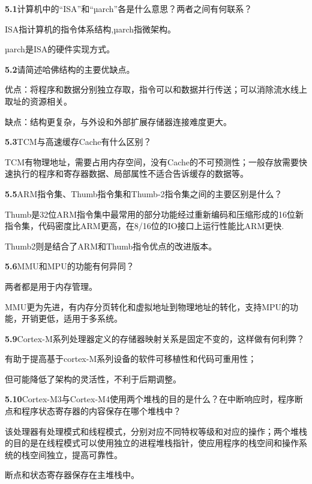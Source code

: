 \documentclass{article}
\begin{document}
    \noindent\textbf{5.1}计算机中的“ISA”和“µarch”各是什么意思？两者之间有何联系？\par
    ISA指计算机的指令体系结构,µarch指微架构。\par
    µarch是ISA的硬件实现方式。
    \\[4pt]\par

    \noindent\textbf{5.2}请简述哈佛结构的主要优缺点。\par
    优点：将程序和数据分别独立存取，指令可以和数据并行传送；可以消除流水线上取址的资源相关。\par
    缺点：结构更复杂，与外设和外部扩展存储器连接难度更大。
    \\[4pt]\par

    \noindent\textbf{5.3}TCM与高速缓存Cache有什么区别？\par
    TCM有物理地址，需要占用内存空间，没有Cache的不可预测性；一般存放需要快速执行的程序和寄存器数据、局部属性不适合告诉缓存的数据等。
    \\[4pt]\par

    \noindent\textbf{5.5}ARM指令集、Thumb指令集和Thumb-2指令集之间的主要区别是什么？\par
    Thumb是32位ARM指令集中最常用的部分功能经过重新编码和压缩形成的16位新指令集，代码密度比ARM更高，在8/16位的IO接口上运行性能比ARM更快.\par
    Thumb2则是结合了ARM和Thumb指令优点的改进版本。
    \\[4pt]\par

    \noindent\textbf{5.6}MMU和MPU的功能有何异同？\par
    两者都是用于内存管理。\par
    MMU更为先进，有内存分页转化和虚拟地址到物理地址的转化，支持MPU的功能，开销更低，适用于多系统。
    \\[4pt]\par

    \noindent\textbf{5.9}Cortex-M系列处理器定义的存储器映射关系是固定不变的，这样做有何利弊？\par
    有助于提高基于cortex-M系列设备的软件可移植性和代码可重用性；\par
    但可能降低了架构的灵活性，不利于后期调整。
    \\[4pt]\par

    \noindent\textbf{5.10}Cortex-M3与Cortex-M4使用两个堆栈的目的是什么？在中断响应时，程序断点和程序状态寄存器的内容保存在哪个堆栈中？\par
    该处理器有处理模式和线程模式，分别对应不同特权等级和对应的操作；两个堆栈的目的是在线程模式可以使用独立的进程堆栈指针，使应用程序的栈空间和操作系统的栈空间独立，提高可靠性。\par
    断点和状态寄存器保存在主堆栈中。
    \\[4pt]\par
\end{document}
